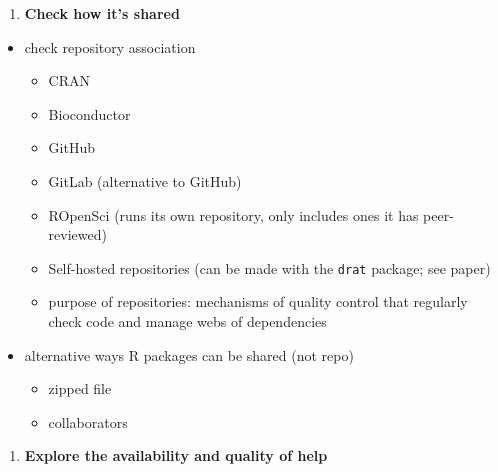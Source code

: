 \documentclass[10pt,letterpaper]{article}
\providecommand{\tightlist}{%
  \setlength{\itemsep}{0pt}\setlength{\parskip}{0pt}}
\begin{document}
\begin{enumerate}
\def\labelenumi{\arabic{enumi}.}
\setcounter{enumi}{2}
\tightlist
\item
  \textbf{Check how it's shared}
\end{enumerate}

\begin{itemize}
\tightlist
\item
  check repository association

  \begin{itemize}
  \tightlist
  \item
    CRAN
  \item
    Bioconductor
  \item
    GitHub
  \item
    GitLab (alternative to GitHub)
  \item
    ROpenSci (runs its own repository, only includes ones it has
    peer-reviewed)
  \item
    Self-hosted repositories (can be made with the \texttt{drat}
    package; see paper)
  \item
    purpose of repositories: mechanisms of quality control that
    regularly check code and manage webs of dependencies
  \end{itemize}
\item
  alternative ways R packages can be shared (not repo)

  \begin{itemize}
  \tightlist
  \item
    zipped file
  \item
    collaborators
  \end{itemize}
\end{itemize}

\begin{enumerate}
\def\labelenumi{\arabic{enumi}.}
\setcounter{enumi}{3}
\tightlist
\item
  \textbf{Explore the availability and quality of help}
\end{enumerate}
\end{document}
